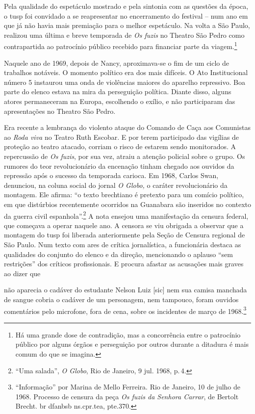 Pela qualidade do espetáculo mostrado e pela sintonia com as questões da
época, o {\sc tusp} foi convidado a se reapresentar no encerramento do
festival -- num ano em que já não havia mais premiação para o melhor
espetáculo. Na volta a São Paulo, realizou uma última e breve temporada
de {\it Os fuzis} no Theatro São Pedro como contrapartida ao patrocínio
público recebido para financiar parte da viagem.\footnote{Há uma grande
  dose de contradição, mas a concorrência entre o patrocínio público por
  alguns órgãos e perseguição por outros durante a ditadura é mais comum
  do que se imagina.}

Naquele ano de 1969, depois de Nancy, aproximava-se o fim de um ciclo de
trabalhos notáveis. O momento político era dos mais difíceis. O Ato
Institucional número 5 instaurou uma onda de violências maiores do
aparelho repressivo. Boa parte do elenco estava na mira da perseguição
política. Diante disso, alguns atores permaneceram na Europa, escolhendo
o exílio, e não participaram das apresentações no Theatro São Pedro.

Era recente a lembrança do violento ataque do Comando de Caça aos
Comunistas ao {\it Roda viva} no Teatro Ruth Escobar. E por terem
participado das vigílias de proteção ao teatro atacado, corriam o risco
de estarem sendo monitorados. A repercussão de {\it Os fuzis}, por sua
vez, atraiu a atenção policial sobre o grupo. Os rumores do teor
revolucionário da encenação tinham chegado aos ouvidos da repressão após
o sucesso da temporada carioca. Em 1968, Carlos Swan, denunciou, na
coluna social do jornal {\it O Globo,} o caráter revolucionário da
montagem. Ele afirma: “o texto brechtiano é pretexto para um comício
político, em que distúrbios recentemente ocorridos na Guanabara são
inseridos no contexto da guerra civil espanhola”.\footnote{“Uma salada”,
  {\it O Globo}, Rio de Janeiro, 9 jul. 1968, p.\,4.} A nota ensejou uma
manifestação da censura federal, que começava a operar naquele ano. A
censora se viu obrigada a observar que a montagem do {\sc tusp} foi liberada
anteriormente pela Seção de Censura regional de São Paulo. Num texto com
ares de crítica jornalística, a funcionária destaca as qualidades do
conjunto do elenco e da direção, mencionando o aplauso “sem restrições”
dos críticos profissionais. E procura afastar as acusações mais graves
ao dizer que

\startblockquote
não aparecia o cadáver do estudante Nelson Luiz {[}sic{]} nem sua camisa
manchada de sangue cobria o cadáver de um personagem, nem tampouco,
foram ouvidos comentários pelo microfone, fora de cena, sobre os
incidentes de março de 1968.\footnote{“Informação” por Marina de Mello
  Ferreira. Rio de Janeiro, 10 de julho de 1968. Processo de censura da
  peça {\it Os fuzis da Senhora Carrar}, de Bertolt Brecht. {\sc br dfanbsb
    ns.cpr.tea, pte.370}.}
\stopblockquote

